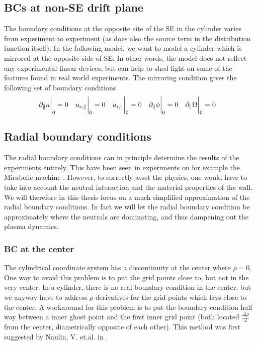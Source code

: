 \subsection{BCs at non-SE drift plane}
The boundary conditions at the opposite site of the SE in the cylinder varies from experiment to experiment (as does also the source term in the distribution function itself).
In the following model, we want to model a cylinder which is mirrored at the opposite side of SE.
In other words, the model does not reflect any experimental linear devices, but can help to shed light on some of the features found in real world experiments.
The mirroring condition gives the following set of boundary conditions
%
\begin{align*}
    &\partial_\| n \bigg|_0    =0 &
    &u_{e,\|} \bigg|_0         =0 &
    &u_{i,\|} \bigg|_0         =0 &
    &\partial_\| \phi \bigg|_0 =0 &
    &\partial_\|\Omega \bigg|_0   =0 &
\end{align*}

\subsection{Radial boundary conditions}
%
The radial boundary conditions can in principle determine the results of the experiments entirely.
This have been seen in experiments on for example the Mirabelle machine \cite{Schroder2001}.
However, to correctly asset the physics, one would have to take into account the neutral interaction and the material properties of the wall.
We will therefore in this thesis focus on a much simplified approximation of the radial boundary conditions.
In fact we will let the radial boundary condition be approximately where the neutrals are dominating, and thus dampening out the plasma dynamics.

\subsubsection{BC at the center}
%
The cylindrical coordinate system has a discontinuity at the center where $\rho=0$.
One way to avoid this problem is to put the grid points close to, but not in the very center.
In a cylinder, there is no real boundary condition in the center, but we anyway have to address $\rho$ derivatives for the grid points which lays close to the center.
A workaround for this problem is to put the boundary condition half way between a inner ghost point and the first inner grid point (both located $\frac{\Delta \rho}{2}$ from the center, diametrically opposite of each other).
This method was first suggested by Naulin, V. et.al. in \cite{Naulin2008}.


